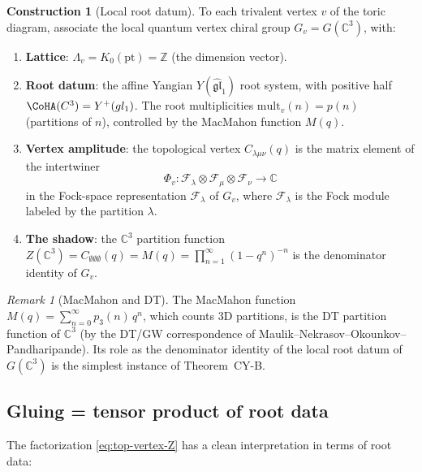 \documentclass[11pt]{amsart}
\theoremstyle{plain}
\theoremstyle{definition}
\newtheorem{construction}[theorem]{Construction}
\theoremstyle{remark}
\newtheorem{remark}[theorem]{Remark}
\newcommand{\cF}{\mathcal{F}}
\begin{document}
\begin{construction}[Local root datum]
\label{constr:local-root-datum}
To each trivalent vertex $v$ of the toric diagram, associate the local
quantum vertex chiral group $G_v = G(\mathbb{C}^3)$, with:
\begin{enumerate}[label=(\roman*)]
 \item \textbf{Lattice}: $\Lambda_v = K_0(\mathrm{pt}) = \mathbb{Z}$
 (the dimension vector).
 \item \textbf{Root datum}: the affine Yangian $Y(\widehat{\mathfrak{gl}}_1)$
 root system, with positive half $\CoHA(\mathbb{C}^3)=
 Y^+(\widehat{\mathfrak{gl}}_1)$. The root multiplicities
 $\mathrm{mult}_v(n) = p(n)$
 (partitions of $n$), controlled by the MacMahon function $M(q)$.
 \item \textbf{Vertex amplitude}: the topological vertex
 $C_{\lambda\mu\nu}(q)$ is the matrix element of the intertwiner
 \[
 \Phi_v \colon \cF_{\lambda} \otimes \cF_{\mu} \otimes \cF_{\nu}
 \to \mathbb{C}
 \]
 in the Fock-space representation $\cF_\lambda$ of $G_v$, where
 $\cF_\lambda$ is the Fock module labeled by the partition $\lambda$.
 \item \textbf{The shadow}: the $\mathbb{C}^3$ partition function
 $Z(\mathbb{C}^3) = C_{\emptyset\emptyset\emptyset}(q) = M(q)
 = \prod_{n=1}^\infty (1-q^n)^{-n}$ is the denominator identity of $G_v$.
\end{enumerate}
\end{construction}

\begin{remark}[MacMahon and DT]
The MacMahon function $M(q) = \sum_{n=0}^\infty p_3(n)\, q^n$, which counts
3D partitions, is the DT partition function of $\mathbb{C}^3$ (by
the DT/GW correspondence of Maulik--Nekrasov--Okounkov--Pandharipande).
Its role as the denominator identity of the local root datum of $G(\mathbb{C}^3)$
is the simplest instance of Theorem~CY-B.
\end{remark}

\subsection{Gluing = tensor product of root data}
\label{sub:gluing}

The factorization \eqref{eq:top-vertex-Z} has a clean interpretation in
terms of root data:
\end{document}
